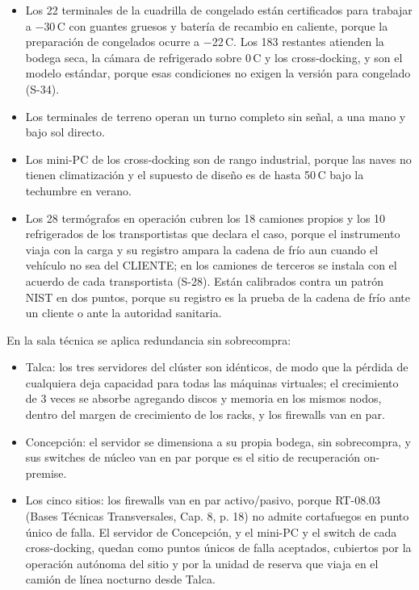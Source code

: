 \begin{itemize}
  \item Los 22 terminales de la cuadrilla de congelado están certificados para trabajar a $-$30\,\textdegree{}C con guantes gruesos y batería de recambio en caliente, porque la preparación de congelados ocurre a $-$22\,\textdegree{}C. Los 183 restantes atienden la bodega seca, la cámara de refrigerado sobre 0\,\textdegree{}C y los cross-docking, y son el modelo estándar, porque esas condiciones no exigen la versión para congelado (S-34).
  \item Los terminales de terreno operan un turno completo sin señal, a una mano y bajo sol directo.
  \item Los mini-PC de los cross-docking son de rango industrial, porque las naves no tienen climatización y el supuesto de diseño es de hasta 50\,\textdegree{}C bajo la techumbre en verano.
  \item Los 28 termógrafos en operación cubren los 18 camiones propios y los 10 refrigerados de los transportistas que declara el caso, porque el instrumento viaja con la carga y su registro ampara la cadena de frío aun cuando el vehículo no sea del CLIENTE; en los camiones de terceros se instala con el acuerdo de cada transportista (S-28). Están calibrados contra un patrón NIST en dos puntos, porque su registro es la prueba de la cadena de frío ante un cliente o ante la autoridad sanitaria.
\end{itemize}

En la sala técnica se aplica redundancia sin sobrecompra:

\begin{itemize}
  \item Talca: los tres servidores del clúster son idénticos, de modo que la pérdida de cualquiera deja capacidad para todas las máquinas virtuales; el crecimiento de 3 veces se absorbe agregando discos y memoria en los mismos nodos, dentro del margen de crecimiento de los racks, y los firewalls van en par.
  \item Concepción: el servidor se dimensiona a su propia bodega, sin sobrecompra, y sus switches de núcleo van en par porque es el sitio de recuperación on-premise.
  \item Los cinco sitios: los firewalls van en par activo/pasivo, porque RT-08.03 (Bases Técnicas Transversales, Cap. 8, p. 18) no admite cortafuegos en punto único de falla. El servidor de Concepción, y el mini-PC y el switch de cada cross-docking, quedan como puntos únicos de falla aceptados, cubiertos por la operación autónoma del sitio y por la unidad de reserva que viaja en el camión de línea nocturno desde Talca.
\end{itemize}

